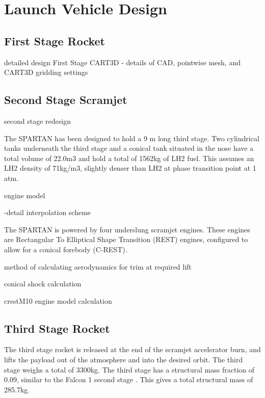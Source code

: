 
\cleardoublepage
\chapter{Launch Vehicle Design}\label{chapter:methodology}

\section{First Stage Rocket}


	detailed design
	First Stage CART3D
	- details of CAD, pointwise mesh, and CART3D gridding settings
	
	
	\section{Second Stage Scramjet}
		second stage redesign
		
		The SPARTAN has been designed to hold a 9 m long third stage. Two cylindrical tanks underneath the third stage and a conical tank situated in the nose have a total volume of 22.0m3 and hold a total of 1562kg of LH2 fuel. This assumes an LH2 density of 71kg/m3, slightly denser than LH2 at phase transition point at 1 atm.
		
		
		
		
		
		
		engine model
		
		-detail interpolation scheme
		
		The SPARTAN is powered by four underslung scramjet engines. These engines are Rectangular To Elliptical Shape Transition (REST) engines, configured to allow for a conical forebody (C-REST).
		
		method of calculating aerodynamics for trim at required lift
		
		conical shock calculation
		
		crestM10 engine model calculation
		
		
		
		
		
		
	
	\section{Third Stage Rocket}
	The third stage rocket is released at the end of the scramjet accelerator burn, and lifts the payload out of the atmosphere and into the desired orbit. The third stage weighs a total of 3300kg. The third stage has a structural mass fraction of 0.09, similar to the Falcon 1 second stage \cite{Vehicle2008}. This gives a total structural mass of 285.7kg. 
	
